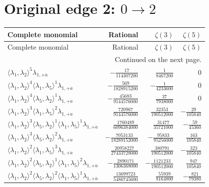 \section{Original edge 2: $0\to 2$}
\begin{longtable}{@{}lrrr@{}}
\toprule
Complete monomial & Rational & $\zeta(3)$ & $\zeta(5)$ \\
\midrule\endfirsthead
\toprule Complete monomial & Rational & $\zeta(3)$ & $\zeta(5)$ \\
\midrule\endhead
\midrule\multicolumn{4}{r}{Continued on the next page.}\\\endfoot
\bottomrule\endlastfoot
$\langle\lambda_1,\lambda_2\rangle^{5}\lambda_{1,+\dot a}$ & $-\frac{17}{114307200}$ & $\frac{1}{8467200}$ & $0$ \\
$\langle\lambda_1,\lambda_2\rangle^{4}\langle\lambda_1,\lambda_5\rangle^{1}\lambda_{1,+\dot a}$ & $-\frac{569}{1828915200}$ & $-\frac{1}{4233600}$ & $0$ \\
$\langle\lambda_1,\lambda_2\rangle^{4}\langle\lambda_5,\lambda_2\rangle^{1}\lambda_{1,+\dot a}$ & $-\frac{45683}{9144576000}$ & $\frac{37}{7938000}$ & $0$ \\
$\langle\lambda_1,\lambda_2\rangle^{3}\langle\lambda_1,\lambda_5\rangle^{2}\lambda_{1,+\dot a}$ & $\frac{720967}{9144576000}$ & $\frac{32353}{190512000}$ & $-\frac{29}{105840}$ \\
$\langle\lambda_1,\lambda_2\rangle^{3}\langle\lambda_5,\lambda_2\rangle^{1}\langle\lambda_1,\lambda_5\rangle^{1}\lambda_{1,+\dot a}$ & $\frac{1760489}{6096384000}$ & $\frac{31477}{35721000}$ & $-\frac{59}{45360}$ \\
$\langle\lambda_1,\lambda_2\rangle^{3}\langle\lambda_5,\lambda_2\rangle^{2}\lambda_{1,+\dot a}$ & $-\frac{7053133}{18289152000}$ & $-\frac{95833}{95256000}$ & $\frac{163}{105840}$ \\
$\langle\lambda_1,\lambda_2\rangle^{2}\langle\lambda_1,\lambda_5\rangle^{3}\lambda_{1,+\dot a}$ & $\frac{20958227}{27433728000}$ & $\frac{380791}{190512000}$ & $-\frac{323}{105840}$ \\
$\langle\lambda_1,\lambda_2\rangle^{2}\langle\lambda_5,\lambda_2\rangle^{1}\langle\lambda_1,\lambda_5\rangle^{2}\lambda_{1,+\dot a}$ & $-\frac{2890171}{1306368000}$ & $-\frac{1121233}{190512000}$ & $\frac{947}{105840}$ \\
$\langle\lambda_1,\lambda_2\rangle^{2}\langle\lambda_5,\lambda_2\rangle^{2}\langle\lambda_1,\lambda_5\rangle^{1}\lambda_{1,+\dot a}$ & $\frac{13699723}{5486745600}$ & $\frac{55939}{8164800}$ & $-\frac{821}{79380}$ \\

\end{longtable}
